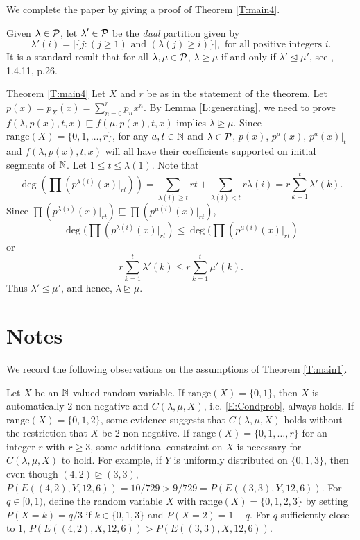 \documentclass[12pt]{article}
\newcommand{\range}{\text{range}}
\begin{document}
We complete the paper by giving a proof of Theorem \ref{T:main4}.

Given $\lambda \in {\cal P}$, let $\lambda' \in {\cal P}$ be the \emph{dual} partition given by 
\[\lambda'(i) = |\{j : (j \geq 1) \text{ and } (\lambda(j) \geq i)\}|, \text{ for all positive integers $i$}.\]  It is a standard result that for all $\lambda, \mu \in {\cal P}$, $\lambda \trianglerighteq \mu$ if and only if $\lambda' \trianglelefteq \mu'$, see \cite{James:1981aa}, 1.4.11, p.26. 

\begin{proofof}{Theorem \ref{T:main4}} 
Let $X$ and $r$ be as in the statement of the theorem.  Let $p(x) = p_X(x) = \sum_{n=0}^r p_n x^n$.  By Lemma \ref{L:generating}, we need to prove $f(\lambda,p(x),t,x) \sqsubseteq f(\mu,p(x),t,x)$ implies $\lambda \trianglerighteq \mu$.  Since $\range(X) = \{0, 1, \ldots, r\}$, for any $a ,t \in \mathbb{N}$ and $\lambda \in {\cal P}$, $p(x)$, $p^a(x)$, $p^a(x)|_t$ and $f(\lambda,p(x),t,x)$ will all have their coefficients supported on initial segments of $\mathbb{N}$.  Let $1 \leq t \leq \lambda(1)$. Note that \[\deg\left(\prod (p^{\lambda(i)}(x)|_{rt})\right) = \sum_{\lambda(i) \geq t} r t + \sum_{\lambda(i) < t} r \lambda(i) = r \sum_{k=1}^t \lambda'(k).\] Since $\prod (p^{\lambda(i)}(x)|_{rt}) \sqsubseteq \prod (p^{\mu(i)}(x)|_{rt})$, \[\deg(\prod (p^{\lambda(i)}(x)|_{rt}) \leq \deg(\prod (p^{\mu(i)}(x)|_{rt})\] or \[r \sum_{k=1}^t \lambda'(k) \leq r \sum_{k=1}^t \mu'(k).\]  Thus $\lambda' \trianglelefteq \mu'$, and hence, $\lambda \trianglerighteq \mu$.  
\end{proofof}

\section{Notes}

We record the following observations on the assumptions of Theorem \ref{T:main1}.

Let $X$ be an $\mathbb{N}$-valued random variable.  If $\range(X) = \{0,1\}$, then $X$ is automatically $2$-non-negative and $C(\lambda,\mu,X)$, i.e. \eqref{E:Condprob}, always holds. If $\range(X) = \{0,1,2\}$, some evidence suggests that $C(\lambda,\mu,X)$ holds without the restriction that $X$ be $2$-non-negative.  If $\range(X) = \{0,1, \ldots, r\}$ for an integer $r$ with $r \geq 3$, some additional constraint on $X$ is necessary for $C(\lambda,\mu,X)$ to hold.  For example, if $Y$ is uniformly distributed on $\{0,1,3\}$, then even though $(4,2) \trianglerighteq (3,3)$, $P(E((4,2),Y,12,6)) = 10/729 > 9/729 = P(E((3,3),Y,12,6))$.  For $q \in [0,1)$, define the random variable $X$ with $\range(X) = \{0,1,2,3\}$ by setting $P(X = k) = q/3$ if $k \in \{0,1,3\}$ and $P(X=2) = 1- q$.  For $q$ sufficiently close to $1$, $P(E((4,2),X,12,6)) > P(E((3,3),X,12,6))$.
\end{document}
